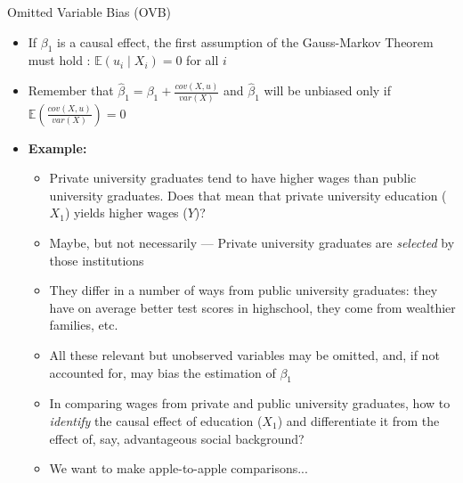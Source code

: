 \documentclass[notes,10pt, aspectratio=169]{beamer}
\begin{document}
\begin{frame}{Omitted Variable Bias (OVB)}
\begin{itemize}
    \item If $\beta_1$ is a causal effect, the first assumption of the Gauss-Markov Theorem must hold : $\mathbb{E}(u_i\mid X_i)=0$ for all $i$
    \item Remember that $\hat{\beta}_1= \beta_1+\frac{cov(X,u)}{var(X)}$ and $\hat{\beta}_1$ will be unbiased only if $\mathbb{E}(\frac{cov(X,u)}{var(X)})=0$
    \item \textbf{Example:}
    \begin{itemize}
      \item Private university graduates tend to have higher wages than public university graduates. Does that mean that private university education ($X_1$) yields higher wages ($Y$)?
      \item Maybe, but not necessarily --- Private university graduates are \textit{selected} by those institutions
      \item They differ in a number of ways from public university graduates: they have on average better test scores in highschool, they come from wealthier families, etc.
      \item All these relevant but unobserved variables may be omitted, and, if not accounted for, may bias the estimation of $\beta_1$
      \item In comparing wages from private and public university graduates, how to \textit{identify} the causal effect of education ($X_1$) and differentiate it from the effect of, say, advantageous social background?
      \item We want to make apple-to-apple comparisons...
    \end{itemize}
    \end{itemize}
\end{frame}
\end{document}
